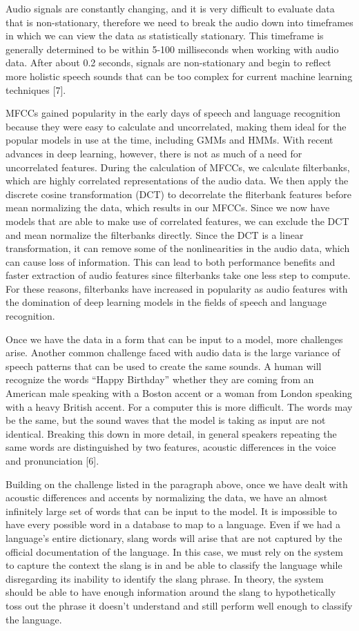 \documentclass{llncs}
\begin{document}
Audio signals are constantly changing, and it is very difficult to evaluate data that is non-stationary, therefore we need to break the audio down into timeframes in which we can view the data as statistically stationary. This timeframe is generally determined to be within 5-100 milliseconds when working with audio data. After about 0.2 seconds, signals are non-stationary and begin to reflect more holistic speech sounds that can be too complex for current machine learning techniques [7].

MFCCs gained popularity in the early days of speech and language recognition because they were easy to calculate and uncorrelated, making them ideal for the popular models in use at the time, including GMMs and HMMs. With recent advances in deep learning, however, there is not as much of a need for uncorrelated features. During the calculation of MFCCs, we calculate filterbanks, which are highly correlated representations of the audio data. We then apply the discrete cosine transformation (DCT) to decorrelate the fliterbank features before mean normalizing the data, which results in our MFCCs. Since we now have models that are able to make use of correlated features, we can exclude the DCT and mean normalize the filterbanks directly. Since the DCT is a linear transformation, it can remove some of the nonlinearities in the audio data, which can cause loss of information. This can lead to both performance benefits and faster extraction of audio features since filterbanks take one less step to compute. For these reasons, filterbanks have increased in popularity as audio features with the domination of deep learning models in the fields of speech and language recognition.

Once we have the data in a form that can be input to a model, more challenges arise. Another common challenge faced with audio data is the large variance of speech patterns that can be used to create the same sounds. A human will recognize the words “Happy Birthday” whether they are coming from an American male speaking with a Boston accent or a woman from London speaking with a heavy British accent. For a computer this is more difficult. The words may be the same, but the sound waves that the model is taking as input are not identical. Breaking this down in more detail, in general speakers repeating the same words are distinguished by two features, acoustic differences in the voice and pronunciation [6].

Building on the challenge listed in the paragraph above, once we have dealt with acoustic differences and accents by normalizing the data, we have an almost infinitely large set of words that can be input to the model. It is impossible to have every possible word in a database to map to a language. Even if we had a language’s entire dictionary, slang words will arise that are not captured by the official documentation of the language. In this case, we must rely on the system to capture the context the slang is in and be able to classify the language while disregarding its inability to identify the slang phrase. In theory, the system should be able to have enough information around the slang to hypothetically toss out the phrase it doesn’t understand and still perform well enough to classify the language.
\end{document}
